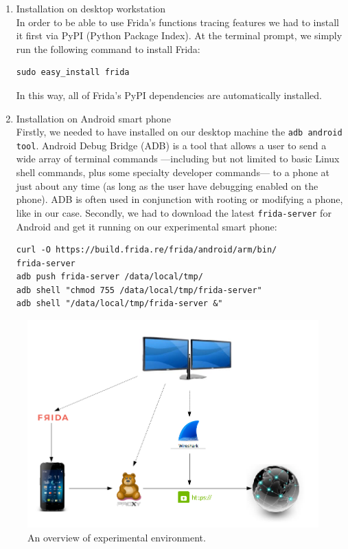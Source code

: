 \documentclass[12pt, a4paper]{report}
\begin{document}
\begin{enumerate}
\item Installation on desktop workstation \\
In order to be able to use Frida's functions tracing features we had to install it first via PyPI (Python Package Index). At the terminal prompt, we simply run the following command to install Frida:
\begin{lstlisting}[frame=single, breaklines=true]
sudo easy_install frida
\end{lstlisting}
In this way, all of Frida’s PyPI dependencies are automatically installed.

\item Installation on Android smart phone \\
Firstly, we needed to have installed on our desktop machine the \texttt{adb android tool}. Android Debug Bridge (ADB) is a tool that allows a user to send a wide array of terminal commands —including but not limited to basic Linux shell commands, plus some specialty developer commands— to a phone at just about any time (as long as the user have debugging enabled on the phone). ADB is often used in conjunction with rooting or modifying a phone, like in our case.
Secondly, we had to download the latest \texttt{frida-server} for Android and get it running on our experimental smart phone:
\begin{lstlisting}[frame=single, breaklines=true]
curl -O https://build.frida.re/frida/android/arm/bin/
frida-server
adb push frida-server /data/local/tmp/
adb shell "chmod 755 /data/local/tmp/frida-server"
adb shell "/data/local/tmp/frida-server &"
\end{lstlisting}

\end{enumerate}   

\begin{figure}[h]
  \includegraphics[width=\linewidth]{images/diagram.png}
  \caption{An overview of experimental environment.}
\end{figure}
\end{document}
